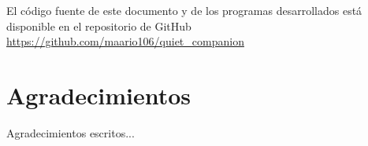 \vspace{1cm}

\begin{flushright}
\myLocation
\end{flushright}

\vspace{3cm}

\doclicenseThis
El código fuente de este documento y de los programas desarrollados está disponible en el repositorio de
GitHub \url{https://github.com/maario106/quiet_companion}


\chapter*{Agradecimientos}
\thispagestyle{empty}

       \vspace{1cm}


Agradecimientos escritos...

\pagestyle{fancy}
